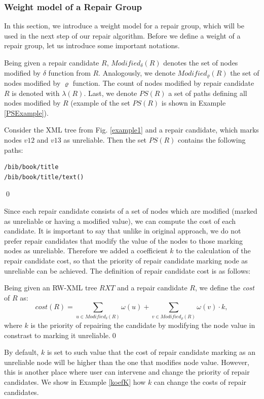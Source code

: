 \subsubsection{Weight model of a Repair Group}

In this section, we introduce a weight model for a repair group, which will be used in the next step of our repair algorithm. Before we define a weight of a repair group, let us introduce some important notations.

Being given a repair candidate $R$, $Modified_\delta(R)$ denotes the set of nodes modified by $\delta$ function from $R$. Analogously, we denote $Modified_\varrho(R)$ the set of nodes modified by $\varrho$ function. The count of nodes modified by repair candidate $R$ is denoted with $\lambda(R)$. Last, we denote $PS(R)$ a set of paths defining all nodes modified by $R$ (example of the set $PS(R)$ is shown in Example \ref{PSExample}).

\begin{example}\label{PSExample}
Consider the XML tree from Fig. \ref{example1} and a repair candidate, which marks nodes $v12$ and $v13$ as unreliable. Then the set $PS(R)$ contains the following paths:
\begin{verbatim}
/bib/book/title
/bib/book/title/text()
\end{verbatim}\qed
\end{example}


Since each repair candidate consists of a set of nodes which are modified (marked as unreliable or having a modified value), we can compute the cost of each candidate. It is important to say that unlike in original approach, we do not prefer repair candidates that modify the value of the nodes to those marking nodes as unreliable. Therefore we added a coefficient $k$ to the calculation of the repair candidate cost, so that the priority of repair candidate marking node as unreliable can be achieved. The definition of repair candidate cost is as follows:

\begin{define}
Being given an RW-XML tree $RXT$ and a repair candidate $R$, we define the {\sl cost} of $R$ as:
$$cost(R) = \sum_{u \in Modified_\delta(R)} \omega(u) + \sum_{v \in Modified_\varrho(R)} \omega(v) \cdot k,$$
where $k$ is the priority of repairing the candidate by modifying the node value in constrast to marking it unreliable.\qed
\end{define}

By default, $k$ is set to such value that the cost of repair candidate marking as an unreliable node will be higher than the one that modifies node value. However, this is another place where user can intervene and change the priority of repair candidates. We show in Example \ref{koefK} how $k$ can change the costs of repair candidates.


